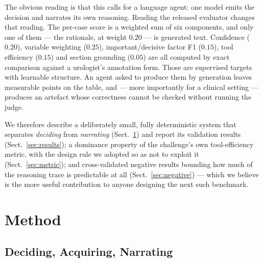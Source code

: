 \documentclass[runningheads]{llncs}
\begin{document}
The obvious reading is that this calls for a language agent: one model emits the
decision and narrates its own reasoning. Reading the released evaluator changes
that reading. The per-case score is a weighted sum of six components, and only one
of them --- the rationale, at weight $0.20$ --- is generated text. Confidence
($0.20$), variable weighting ($0.25$), important/decisive factor F1 ($0.15$), tool
efficiency ($0.15$) and section grounding ($0.05$) are all computed by exact
comparison against a urologist's annotation form. Those are supervised targets with
learnable structure. An agent asked to produce them by generation leaves measurable
points on the table, and --- more importantly for a clinical setting --- produces
an artefact whose correctness cannot be checked without running the judge.

We therefore describe a deliberately small, fully deterministic system that
separates \emph{deciding} from \emph{narrating} (Sect.~\ref{sec:method}) and report
its validation results (Sect.~\ref{sec:results}); a dominance property of the
challenge's own tool-efficiency metric, with the design rule we adopted so as not
to exploit it (Sect.~\ref{sec:metric}); and cross-validated negative results
bounding how much of the reasoning trace is predictable at all
(Sect.~\ref{sec:negative}) --- which we believe is the more useful contribution to
anyone designing the next such benchmark.

\section{Method}
\label{sec:method}

\subsection{Deciding, Acquiring, Narrating}
\end{document}
